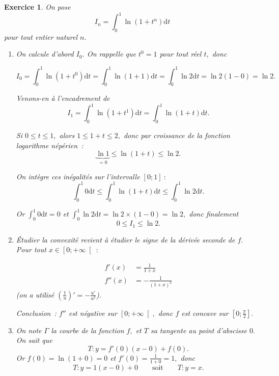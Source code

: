 \documentclass[10pt]{article}
\newtheorem{exo}{Exercice}
\begin{document}
\begin{exo}

On pose \[I_n=\int_0^{1}\ln\left(1+t^n\right)\mathrm{d}t\] pour tout entier naturel $n.$

\begin{enumerate}
\item On calcule d'abord $I_0$. On rappelle que $t^0=1$ pour tout réel $t,$ donc

\[I_0=\int_0^{1}\ln\left(1+t^0\right)\mathrm{d}t=\int_0^{1}\ln\left(1+1\right)\mathrm{d}t
=\int_0^{1}\ln 2\mathrm{d}t=\ln 2(1-0)=\ln2.\]

\medskip

Venons-en à l'encadrement de \[I_1=\int_0^{1}\ln\left(1+t^1\right)\mathrm{d}t=\int_0^{1}\ln\left(1+t\right)\mathrm{d}t.\]

Si $0\leq t\leq 1,$ alors $1\leq 1+t\leq 2,$ donc par croissance de la fonction logarithme népérien~:
\[
\underbrace{\ln 1}_{=0}\leq \ln(1+t)\leq \ln 2.\]

On intègre ces inégalités sur l'intervalle $\left[0;1\right]~:$
\[\int_0^{1} 0\mathrm{d}t\leq \int_0^{1}\ln\left(1+t\right)\mathrm{d}t\leq \int_0^{1}\ln 2\mathrm{d}t.\]

Or $\int_0^{1} 0\mathrm{d}t=0$ et $\int_0^{1}\ln 2\mathrm{d}t=\ln 2\times (1-0)=\ln 2,$ donc finalement
\[0\leq I_1\leq  \ln 2.\]
\item 



Étudier la convexité revient à étudier le signe de la dérivée seconde de $f.$ Pour tout  $x\in\left[0;+\infty\right[~:$

\begin{align*}
f'(x)&=\frac{1}{1+x}\\
f''(x)&=-\frac{1}{(1+x)^2}
\end{align*}
(on a utilisé $\left(\frac{1}{u}\right)'=-\frac{u'}{u^2}$).


\medskip

Conclusion~: $f''$ est négative sur $\left[0;+\infty\right[,$ donc $f$ est concave sur $\left[0;\frac{\pi}{2}\right].$

\newpage
\item \begin{multicols}{2}

On note $\Gamma$ la courbe de la fonction $f,$ et $T$ sa tangente au point d'abscisse $0.$ On sait que
\[T:y=f'(0)(x-0)+f(0).\]
Or $f(0)=\ln(1+0)=0$ et $f'(0)=\frac{1}{1+0}=1,$ donc
\[T:y=1(x-0)+0\qquad\text{soit}\qquad T:y=x.\]


\medskip


\end{multicols}
\end{enumerate}
\end{exo}
\end{document}

